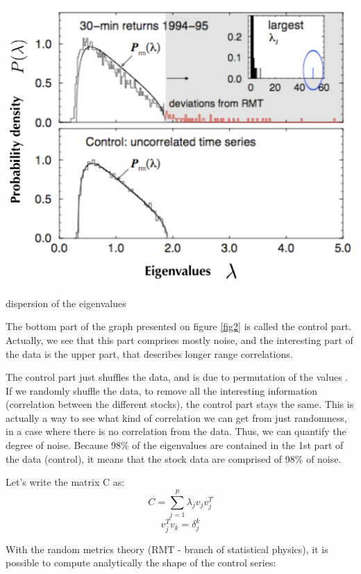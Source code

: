 \begin{marginfigure}
    \includegraphics{./Figures/eigenvaluesdisp.png}
    \caption{dispersion of the eigenvalues}
    \label{fig2}
\end{marginfigure}

The bottom part of the graph presented on figure \ref{fig2} is called the
control part. Actually, we see that this part comprises mostly noise, and the
interesting part of the data is the upper part, that describes longer range
correlations.

The control part just shuffles the data, and is due to permutation of the values
. If we randomly shuffle the data, to remove all the interesting information
(correlation between the different stocks), the control part stays the same.
This is actually a way to see what kind of correlation we can get from just
randomness, in a case where there is no correlation from the data.
Thus, we can quantify the degree of noise. Because 98\% of the eigenvalues are
contained in the 1st part of the data (control), it means that the stock data
are comprised of 98\% of noise.

Let's write the matrix C as:
\begin{equation}
    C = \sum_{j=1}^p \lambda_j v_j v_j^T
\end{equation} 
\begin{equation}
    v_j^T v_k = \delta_j^k
\end{equation}

With the random metrics theory (RMT - branch of statistical physics), it is
possible to compute analytically the shape of the control series:

